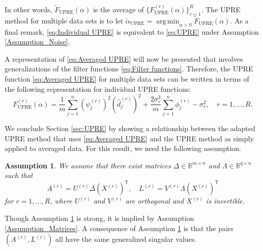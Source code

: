 \documentclass[12pt]{article}
\newcommand{\mA}{m}	%
\newcommand{\mL}{q}	%
\newcommand{\trans}[1]{{#1}^\mathsf{T}}	%
\newcommand{\dft}[1]{\widehat{#1}}	%
\newcommand{\regparam}{\alpha}  %
\DeclareMathOperator*{\argmin}{arg\,min}
\newcommand{\filt}{\phi}
\newcommand{\mfilt}{\psi}
\newcommand{\noiseSD}{\sigma}	%
\newcommand{\U}{F_{\text{UPRE}}}	%
\newcommand{\UBig}{\widetilde{F}_{\text{UPRE}}}	%
\newtheorem{assumption}{Assumption}
\begin{document}
\noindent In other words, $\UBig(\regparam)$ is the average of $\{\U^{(r)}(\regparam)\}_{r=1}^R$. The UPRE method for multiple data sets is to let $\widetilde{\regparam}_{\textrm{UPRE}} = \argmin_{\regparam > 0} \UBig(\regparam)$. As a final remark, \eqref{eq:Individual UPRE} is equivalent to \eqref{eq:UPRE} under Assumption \ref{Assumption_Noise}. \par
A representation of \eqref{eq:Averaged UPRE} will now be presented that involves generalizations of the filter functions \eqref{eq:Filter functions}. 
Therefore, the UPRE function \eqref{eq:Averaged UPRE} for multiple data sets can be written in terms of the following representation for individual UPRE functions:
\begin{equation}
\label{eq:Individual UPRE 2}
\U^{(r)}(\regparam) = \frac{1}{\mA} \sum_{j=1}^{n} \left(\mfilt^{(r)}_j\right)^2\left(\dft{d}_j^{(r)}\right)^2 + \frac{2\noiseSD^2_r}{\mA} \sum_{j=1}^{n} \filt^{(r)}_j - \noiseSD^2_r, \quad r = 1,\ldots,R.
\end{equation}

We conclude Section \ref{sec:UPRE} by showing a relationship between the adapted UPRE method that uses \eqref{eq:Averaged UPRE} and the UPRE method as simply applied to averaged data. For this result, we need the following assumption.

\begin{assumption}
\label{Assumption_Decomposition}
We assume that there exist matrices $\Delta \in \mathbb{R}^{\mA \times n}$ and $\Lambda \in \mathbb{R}^{\mL \times n}$ such that
\[A^{(r)} = U^{(r)}\Delta\trans{\left(X^{(r)}\right)}, \quad L^{(r)} = V^{(r)}\Lambda\trans{\left(X^{(r)}\right)}\]
for $r = 1,\ldots,R$, where $U^{(r)}$ and $V^{(r)}$ are orthogonal and $X^{(r)}$ is invertible.
\end{assumption}

Though Assumption \ref{Assumption_Decomposition} is strong, it is implied by Assumption \ref{Assumption_Matrices}. A consequence of Assumption \ref{Assumption_Decomposition} is that the pairs $(A^{(r)},L^{(r)})$ all have the same generalized singular values.
\end{document}
